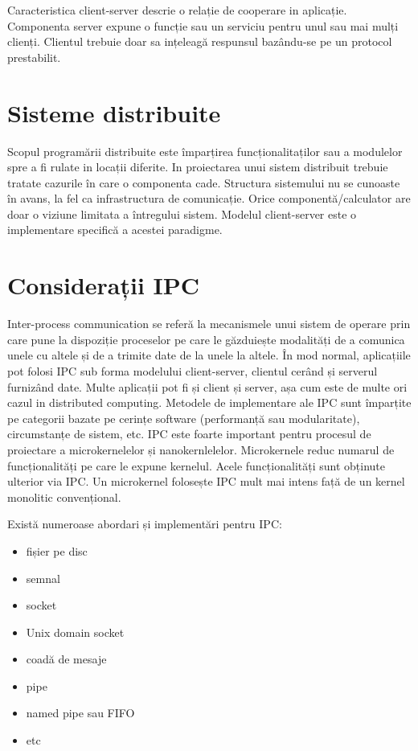 \documentclass[a4paper, 12pt, twoside]{report}
\begin{document}
Caracteristica client-server descrie o relație de cooperare in aplicație. Componenta server expune o funcție sau un serviciu pentru unul sau mai mulți clienți. Clientul trebuie doar sa ințeleagă respunsul bazându-se pe un protocol prestabilit.

	\section{Sisteme distribuite}
Scopul programării distribuite este împarțirea funcționalitaților sau a modulelor spre a fi rulate in locații diferite. In proiectarea unui sistem distribuit trebuie tratate cazurile în care o componenta cade. Structura sistemului nu se cunoaste în avans, la fel ca infrastructura de comunicație. Orice componentă/calculator are doar o viziune limitata a întregului sistem. Modelul client-server este o implementare specifică a acestei paradigme.

	\section{Considerații IPC}
Inter-process communication se referă la mecanismele unui sistem de operare prin care pune la dispoziție proceselor pe care le găzduiește modalități de a comunica unele cu altele și de a trimite date de la unele la altele. În mod normal, aplicațiile pot folosi IPC sub forma modelului client-server, clientul cerând și serverul furnizând date. Multe aplicații pot fi și client și server, așa cum este de multe ori cazul in distributed computing. Metodele de implementare ale IPC sunt împarțite pe categorii bazate pe cerințe software (performanță sau modularitate), circumstanțe de sistem, etc. IPC este foarte important pentru procesul de proiectare a microkernelelor și nanokernlelelor. Microkernele reduc numarul de funcționalități pe care le expune kernelul. Acele funcționalități sunt obținute ulterior via IPC. Un microkernel folosește IPC mult mai intens față de un kernel monolitic convențional.

Există numeroase abordari și implementări pentru IPC:
\begin{itemize}
\item fișier pe disc
\item semnal
\item socket
\item Unix domain socket
\item coadă de mesaje
\item pipe
\item named pipe sau FIFO
\item etc
\end{itemize}
\end{document}
